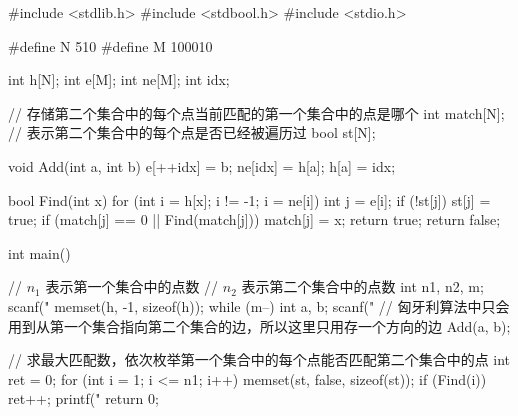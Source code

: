 \begin{mycpptwocol}[匈牙利算法]
    #include <stdlib.h>
    #include <stdbool.h>
    #include <stdio.h>

    #define N 510
    #define M 100010

    int h[N];
    int e[M];
    int ne[M];
    int idx;

    // 存储第二个集合中的每个点当前匹配的第一个集合中的点是哪个
    int match[N];
    // 表示第二个集合中的每个点是否已经被遍历过
    bool st[N];

    void Add(int a, int b) {
        e[++idx] = b;
        ne[idx] = h[a];
        h[a] = idx;
    }

    bool Find(int x) {
        for (int i = h[x]; i != -1; i = ne[i]) {
            int j = e[i];
            if (!st[j]) {
                st[j] = true;
                if (match[j] == 0 || Find(match[j])) {
                    match[j] = x;
                    return true;
                }
            }
        }
        return false;
    }

    int main() {
        // $n_1$ 表示第一个集合中的点数
        // $n_2$ 表示第二个集合中的点数
        int n1, n2, m;
        scanf("%
        memset(h, -1, sizeof(h));
        while (m--) {
            int a, b;
            scanf("%
            // 匈牙利算法中只会用到从第一个集合指向第二个集合的边，所以这里只用存一个方向的边
            Add(a, b);
        }

        // 求最大匹配数，依次枚举第一个集合中的每个点能否匹配第二个集合中的点
        int ret = 0;
        for (int i = 1; i <= n1; i++) {
            memset(st, false, sizeof(st));
            if (Find(i)) {
                ret++;
            }
        }
        printf("%
        return 0;
    }
\end{mycpptwocol}